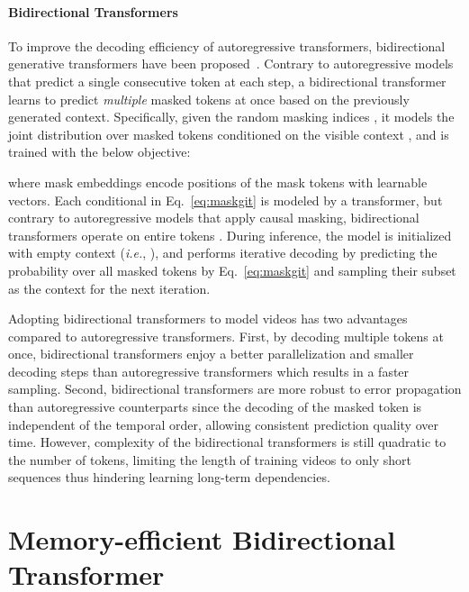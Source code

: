 \documentclass[10pt,twocolumn,letterpaper]{article}
\begin{document}
\paragraph{Bidirectional Transformers}
\label{sec:maskgit}
\ifdefined{} \fi
To improve the decoding efficiency of autoregressive transformers,
bidirectional generative transformers have been proposed~\cite{MaskGIT, M6-UFC, MMVID}.
Contrary to autoregressive models that predict a single consecutive token at each step, a bidirectional transformer learns to predict \emph{multiple} masked tokens at once based on the previously generated context.
Specifically, given the random masking indices , it models the joint distribution over masked tokens  conditioned on the visible context , and is trained with the below objective:

where mask embeddings  encode positions of the mask tokens with learnable vectors. 
Each conditional in Eq.~\eqref{eq:maskgit} is modeled by a transformer, but contrary to autoregressive models that apply causal masking, bidirectional transformers operate on entire tokens .
During inference, the model is initialized with empty context (\emph{i.e.}, ), and performs iterative decoding by predicting the probability over all masked tokens  by Eq.~\eqref{eq:maskgit} and sampling their subset as the context for the next iteration.




Adopting bidirectional transformers to model videos has two advantages compared to autoregressive transformers.
First, by decoding multiple tokens at once, bidirectional transformers enjoy a better parallelization and smaller decoding steps than autoregressive transformers which results in a faster sampling.
Second, bidirectional transformers are more robust to error propagation than autoregressive counterparts since the decoding of the masked token is independent of the temporal order, allowing consistent prediction quality over time.
However, complexity of the bidirectional transformers is still quadratic to the number of tokens, limiting the length of training videos to only short sequences thus hindering learning long-term dependencies.




\section{Memory-efficient Bidirectional Transformer}
\end{document}
